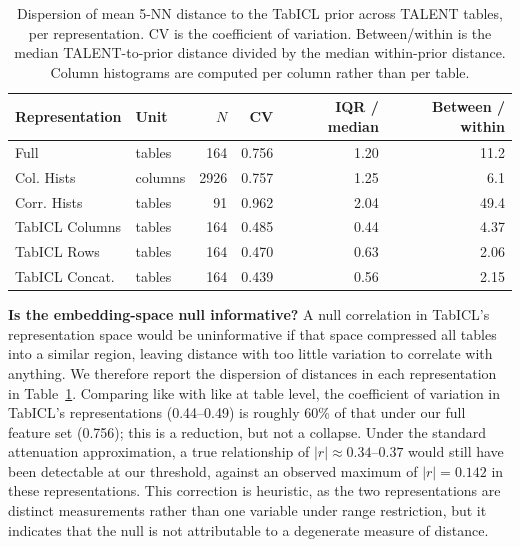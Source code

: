 \documentclass{article}
\begin{document}
\begin{table}[ht]
\centering
\caption{Dispersion of mean 5-NN distance to the TabICL prior across TALENT tables, per representation. CV is the coefficient of variation. Between/within is the median TALENT-to-prior distance divided by the median within-prior distance. Column histograms are computed per column rather than per table.}
\label{tab:dispersion}
\small
\begin{tabular}{llrrrr}
\toprule
Representation & Unit & $N$ & CV & IQR / median & Between / within \\
\midrule
Full & tables & 164 & 0.756 & 1.20 & 11.2 \\
Col. Hists & columns & 2926 & 0.757 & 1.25 & 6.1 \\
Corr. Hists & tables & 91 & 0.962 & 2.04 & 49.4 \\
\midrule
TabICL Columns & tables & 164 & 0.485 & 0.44 & 4.37 \\
TabICL Rows & tables & 164 & 0.470 & 0.63 & 2.06 \\
TabICL Concat. & tables & 164 & 0.439 & 0.56 & 2.15 \\
\bottomrule
\end{tabular}
\end{table}

\textbf{Is the embedding-space null informative?} A null correlation in TabICL's representation space would be uninformative if that space compressed all tables into a similar region, leaving distance with too little variation to correlate with anything.
We therefore report the dispersion of distances in each representation in Table~\ref{tab:dispersion}.
Comparing like with like at table level, the coefficient of variation in TabICL's representations (0.44--0.49) is roughly 60\% of that under our full feature set (0.756); this is a reduction, but not a collapse.
Under the standard attenuation approximation, a true relationship of $|r| \approx 0.34$--$0.37$ would still have been detectable at our threshold, against an observed maximum of $|r| = 0.142$ in these representations.
This correction is heuristic, as the two representations are distinct measurements rather than one variable under range restriction, but it indicates that the null is not attributable to a degenerate measure of distance.
\end{document}
